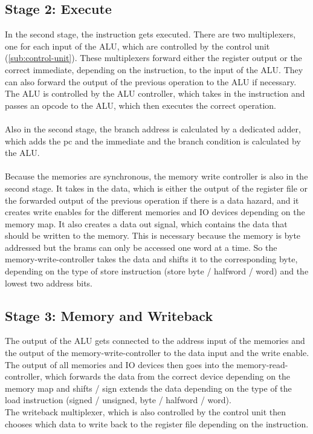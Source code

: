 \documentclass[12pt]{article}
\begin{document}
\subsection{Stage 2: Execute}
In the second stage, the instruction gets executed. There are two multiplexers, one for each input of the ALU, which are controlled by the control unit (\ref{sub:control-unit}). These multiplexers forward either the register output or the correct immediate, depending on the instruction, to the input of the ALU. They can also forward the output of the previous operation to the ALU if necessary. The ALU is controlled by the ALU controller, which takes in the instruction and passes an opcode to the ALU, which then executes the correct operation.\\\\
Also in the second stage, the branch address is calculated by a dedicated adder, which adds the pc and the immediate and the branch condition is calculated by the ALU.\\\\
Because the memories are synchronous, the memory write controller is also in the second stage. It takes in the data, which is either the output of the register file or the forwarded output of the previous operation if there is a data hazard, and it creates write enables for the different memories and IO devices depending on the memory map. It also creates a data out signal, which contains the data that should be written to the memory. This is necessary because the memory is byte addressed but the brams can only be accessed one word at a time. So the memory-write-controller takes the data and shifts it to the corresponding byte, depending on the type of store instruction (store byte / halfword / word) and the lowest two address bits.


\subsection{Stage 3: Memory and Writeback}
The output of the ALU gets connected to the address input of the memories and the output of the memory-write-controller to the data input and the write enable. The output of all memories and IO devices then goes into the memory-read-controller, which forwards the data from the correct device depending on the memory map and shifts / sign extends the data depending on the type of the load instruction (signed / unsigned, byte / halfword / word).\\
The writeback multiplexer, which is also controlled by the control unit then chooses which data to write back to the register file depending on the instruction.
\end{document}
